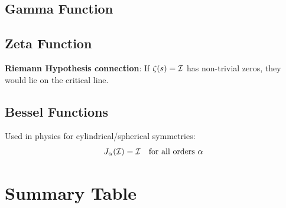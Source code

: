 \subsection*{Gamma Function}


\subsection*{Zeta Function}


\textbf{Riemann Hypothesis connection}: If $\zeta(s) = \mathcal{I}$ has non-trivial zeros, they would lie on the critical line.

\subsection*{Bessel Functions}

Used in physics for cylindrical/spherical symmetries:
\[
J_\alpha(\mathcal{I}) = \mathcal{I} \quad \text{for all orders } \alpha
\]

\section*{Summary Table}

